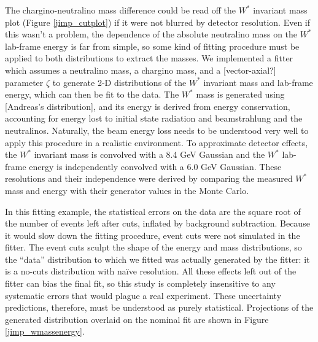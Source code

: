\documentclass[12pt]{article}
\begin{document}
The chargino-neutralino mass difference could be read off the $W^*$
invariant mass plot (Figure \ref{jimp_cutplot}) if it were not blurred
by detector resolution.  Even if this wasn't a problem, the dependence
of the absolute neutralino mass on the $W^*$ lab-frame energy is far
from simple, so some kind of fitting procedure must be applied to both
distributions to extract the masses.  We implemented a fitter which
assumes a neutralino mass, a chargino mass, and a [vector-axial?]
parameter $\zeta$ to generate 2-D distributions of the $W^*$ invariant
mass and lab-frame energy, which can then be fit to the data.  The
$W^*$ mass is generated using [Andreas's distribution], and its energy
is derived from energy conservation, accounting for energy lost to
initial state radiation and beamstrahlung and the neutralinos.
Naturally, the beam energy loss needs to be understood very well to
apply this procedure in a realistic environment.  To approximate
detector effects, the $W^*$ invariant mass is convolved with a 8.4 GeV
Gaussian and the $W^*$ lab-frame energy is independently convolved
with a 6.0 GeV Gaussian.  These resolutions and their independence
were derived by comparing the measured $W^*$ mass and energy with
their generator values in the Monte Carlo.

In this fitting example, the statistical errors on the data are the
square root of the number of events left after cuts, inflated by
background subtraction.  Because it would slow down the fitting
procedure, event cuts were not simulated in the fitter.  The event
cuts sculpt the shape of the energy and mass distributions, so the
``data'' distribution to which we fitted was actually generated by the
fitter: it is a no-cuts distribution with na\"ive resolution.  All
these effects left out of the fitter can bias the final fit, so this
study is completely insensitive to any systematic errors that would
plague a real experiment.  These uncertainty predictions, therefore,
must be understood as purely statistical.  Projections of the
generated distribution overlaid on the nominal fit are shown in Figure
\ref{jimp_wmassenergy}.
\end{document}
